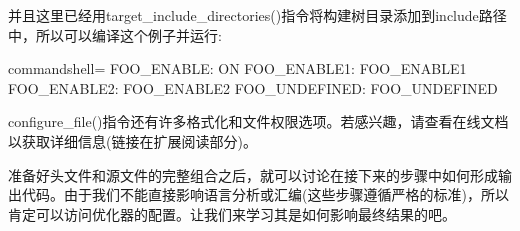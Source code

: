 并且这里已经用target\_include\_directories()指令将构建树目录添加到include路径中，所以可以编译这个例子并运行:

\begin{tcblisting}{commandshell={}}
FOO_ENABLE: ON
FOO_ENABLE1: FOO_ENABLE1
FOO_ENABLE2: FOO_ENABLE2
FOO_UNDEFINED: FOO_UNDEFINED
\end{tcblisting}

configure\_file()指令还有许多格式化和文件权限选项。若感兴趣，请查看在线文档以获取详细信息(链接在扩展阅读部分)。

准备好头文件和源文件的完整组合之后，就可以讨论在接下来的步骤中如何形成输出代码。由于我们不能直接影响语言分析或汇编(这些步骤遵循严格的标准)，所以肯定可以访问优化器的配置。让我们来学习其是如何影响最终结果的吧。

























